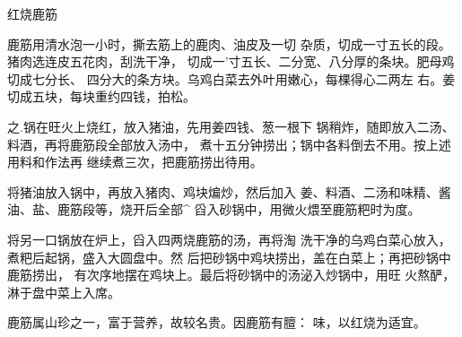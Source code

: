 \begin{recipe}{红烧鹿筋}

\ingredients


\cooking

\step 鹿筋用清水泡一小时，撕去筋上的鹿肉、油皮及一切 杂质，切成一寸五长的段。猪肉选连皮五花肉，刮洗干净， 切成一'寸五长、二分宽、八分厚的条块。肥母鸡切成七分长、 四分大的条方块。乌鸡白菜去外叶用嫩心，每棵得心二两左 右。姜切成五块，每块重约四钱，拍松。

之.锅在旺火上烧红，放入猪油，先用姜四钱、葱一根下 锅稍炸，随即放入二汤、料酒，再将鹿筋段全部放入汤中， 煮十五分钟捞出；锅中各料倒去不用。按上述用料和作法再 继续煮三次，把鹿筋捞出待用。

\step 	将猪油放入锅中，再放入猪肉、鸡块煸炒，然后加入 姜、料酒、二汤和味精、酱油、盐、鹿筋段等，烧开后全部^ 舀入砂锅中，用微火煨至鹿筋粑时为度。

\step 	将另一口锅放在炉上，舀入四两烧鹿筋的汤，再将淘 洗干净的乌鸡白菜心放入，煮粑后起锅，盛入大圆盘中。然 后把砂锅中鸡块捞出，盖在白菜上；再把砂锅中鹿筋捞出， 有次序地摆在鸡块上。最后将砂锅中的汤泌入炒锅中，用旺 火熬酽，淋于盘中菜上入席。

\notes

鹿筋属山珍之一，富于营养，故较名贵。因鹿筋有膻： 味，以红烧为适宜。

\end{recipe}

